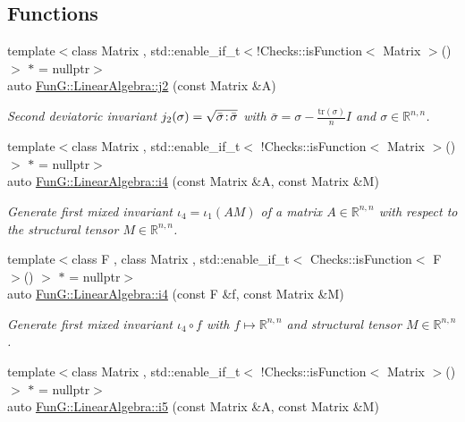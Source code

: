 \subsection*{Functions}
\begin{DoxyCompactItemize}
\item 
{\footnotesize template$<$class Matrix , std\-::enable\-\_\-if\-\_\-t$<$!\-Checks\-::is\-Function$<$ Matrix $>$()$>$ $\ast$  = nullptr$>$ }\\auto \hyperlink{group__InvariantGroup_ga9a2bc859fe1ae34b1a3ada91a39d69df}{Fun\-G\-::\-Linear\-Algebra\-::j2} (const Matrix \&A)
\begin{DoxyCompactList}\small\item\em Second deviatoric invariant $ j_2(\sigma)=\sqrt{\bar\sigma\negthinspace:\negthinspace\bar\sigma} $ with $\bar\sigma = \sigma - \frac{\mathrm{tr}(\sigma)}{n}I$ and $\sigma\in\mathbb{R}^{n,n}$. \end{DoxyCompactList}\item 
{\footnotesize template$<$class Matrix , std\-::enable\-\_\-if\-\_\-t$<$ !\-Checks\-::is\-Function$<$ Matrix $>$() $>$ $\ast$  = nullptr$>$ }\\auto \hyperlink{group__InvariantGroup_ga1898785172ecce11af0c27e54d555009}{Fun\-G\-::\-Linear\-Algebra\-::i4} (const Matrix \&A, const Matrix \&M)
\begin{DoxyCompactList}\small\item\em Generate first mixed invariant $ \iota_4=\iota_1(AM) $ of a matrix $A\in\mathbb{R}^{n,n}$ with respect to the structural tensor $M\in\mathbb{R}^{n,n}$. \end{DoxyCompactList}\item 
{\footnotesize template$<$class F , class Matrix , std\-::enable\-\_\-if\-\_\-t$<$ Checks\-::is\-Function$<$ F $>$() $>$ $\ast$  = nullptr$>$ }\\auto \hyperlink{group__InvariantGroup_ga0df96cdb1e4b8b5a040f2adc97c51100}{Fun\-G\-::\-Linear\-Algebra\-::i4} (const F \&f, const Matrix \&M)
\begin{DoxyCompactList}\small\item\em Generate first mixed invariant $ \iota_4\circ f $ with $f\mapsto\mathbb{R}^{n,n}$ and structural tensor $M\in\mathbb{R}^{n,n}$. \end{DoxyCompactList}\item 
{\footnotesize template$<$class Matrix , std\-::enable\-\_\-if\-\_\-t$<$ !\-Checks\-::is\-Function$<$ Matrix $>$() $>$ $\ast$  = nullptr$>$ }\\auto \hyperlink{group__InvariantGroup_gabedc42182203d883278e29fd16b355a0}{Fun\-G\-::\-Linear\-Algebra\-::i5} (const Matrix \&A, const Matrix \&M)

\end{DoxyCompactItemize}

